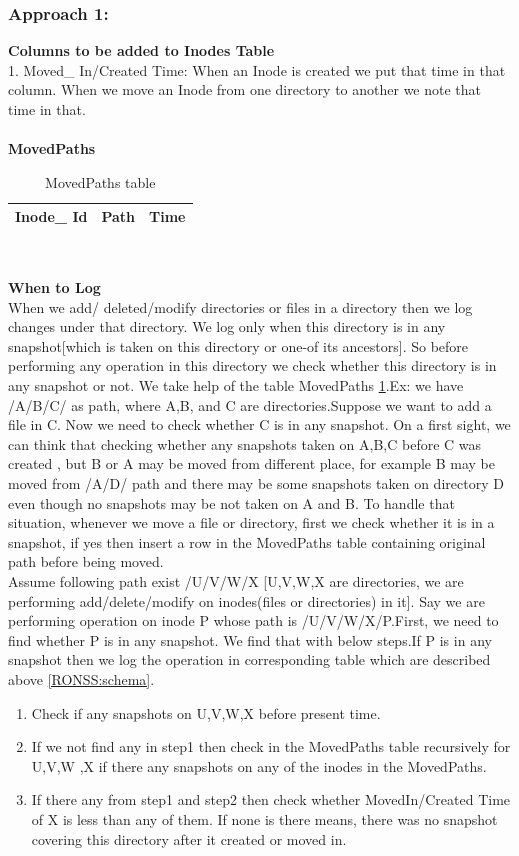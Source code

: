 \subsubsection{Approach 1:}
\textbf{Columns to be added to Inodes Table}\\
1. Moved\_ In/Created Time: When an Inode is created we put that time in that column. When we move an Inode from one directory to another we note that time in that.\\\\
\textbf{MovedPaths}\\
\begin{table}[h!]
\begin{tabular}{|c|c|c|}
\hline
Inode\_ Id&
Path&
Time\\
\hline
\end{tabular}\\
\caption{MovedPaths table}
\label{movedPaths}
\end{table}


\textbf{When to Log}\\
 When we add/ deleted/modify directories or files in a directory then we log changes under that directory. We log only when this directory is in any snapshot[which is taken on this directory or one-of its ancestors]. So before performing any operation in this directory we check whether this directory is in any snapshot or not. We take help of the table MovedPaths \ref{movedPaths}.Ex: we have /A/B/C/ as path, where A,B, and C are directories.Suppose we want to add a file in C. Now we need to check whether C is in any snapshot. On a first sight, we can think that checking whether any snapshots taken on A,B,C before C was created , but B or A may be moved from different place, for example B may be moved from /A/D/ path and there may be some snapshots taken on directory D even though no snapshots may be not taken on A and B. To handle that situation, whenever we move a file or directory, first we check whether it is in a snapshot, if yes then insert a row in the MovedPaths table containing original path before being moved. \\
 Assume following path exist /U/V/W/X [U,V,W,X are directories, we are performing add/delete/modify on inodes(files or directories) in it]. Say we are performing operation on inode P whose path is /U/V/W/X/P.First, we need to find whether P is in any snapshot. We find that with below steps.If P is in any snapshot then we log the operation in corresponding table which are described above \ref{RONSS:schema}. 
 \begin{enumerate}
 \item  Check if any snapshots on U,V,W,X before present time.
\item  If we not find any in step1 then check in the MovedPaths table recursively for U,V,W ,X if there any snapshots on any of the inodes in the MovedPaths.
\item If there any from step1 and step2 then check whether MovedIn/Created Time of X is less than any of them. If none is there means, there was no snapshot covering this directory after it created or moved in.
\end{enumerate}  

